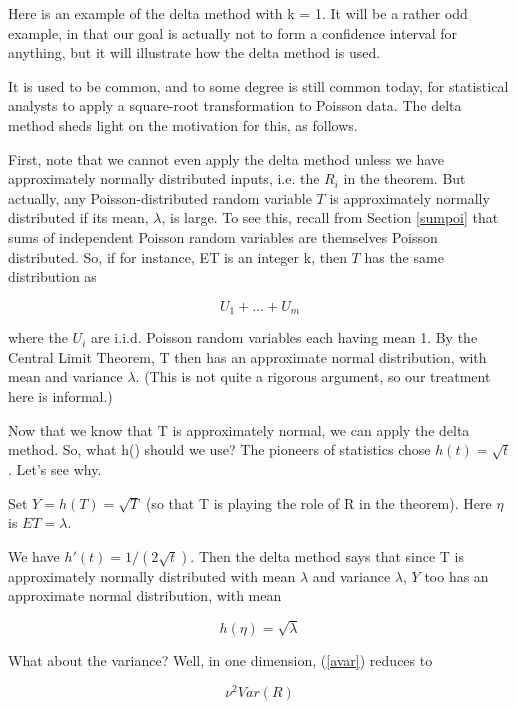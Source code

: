 Here is an example of the delta method with k = 1.  It will be a rather
odd example, in that our goal is actually not to form a confidence
interval for anything, but it will illustrate how the delta method is
used.

It is used to be common, and to some degree is still common today, for
statistical analysts to apply a square-root transformation to Poisson
data.  The delta method sheds light on the motivation for this, as
follows.

First, note that we cannot even apply the delta method unless we have
approximately normally distributed inputs, i.e. the $R_i$ in the
theorem.  But actually, any Poisson-distributed random variable $T$ is
approximately normally distributed if its mean, $\lambda$, is large.  To
see this,  recall from Section \ref{sumpoi} that sums of independent
Poisson random variables are themselves Poisson distributed.  So, if for
instance, ET is an integer k, then $T$ has the same distribution as

\begin{equation}
U_1+...+U_m
\end{equation}

where the $U_i$ are i.i.d. Poisson random variables each having mean 1.
By the Central Limit Theorem, T then has an approximate normal
distribution, with mean and variance $\lambda$.  (This is not quite a
rigorous argument, so our treatment here is informal.) 

Now that we know that T is approximately normal, we can apply the delta
method.  So, what h() should we use?  The pioneers of statistics chose 
$h(t) = \sqrt{t}$.  Let's see why.

Set $Y = h(T) = \sqrt{T}$ (so that T is playing the role of R in the
theorem).  Here $\eta$ is $ET = \lambda$.

We have $h'(t) = 1 / (2\sqrt{t})$.  Then the delta method says that
since T is approximately normally distributed with mean $\lambda$ and
variance $\lambda$, $Y$ too has an approximate normal distribution, with
mean 

\begin{equation}
h(\eta) = \sqrt{\lambda}
\end{equation}

What about the variance?  Well, in one dimension, (\ref{avar}) reduces
to

\begin{equation}
\nu^2 Var(R)
\end{equation}

